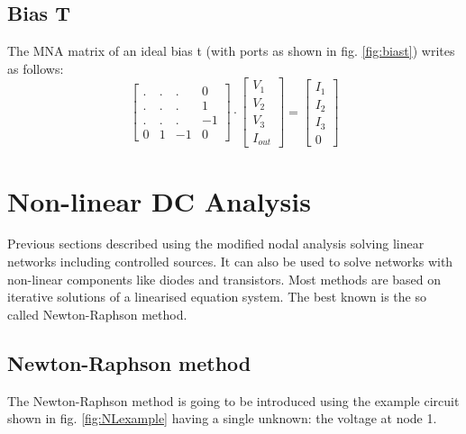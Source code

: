 \documentclass[10pt]{report}
\begin{document}
\subsection{Bias T}

The MNA matrix of an ideal bias t (with ports as shown in
fig. \ref{fig:biast}) writes as follows:
\begin{equation}
\begin{bmatrix}
 . & . & .  &  0\\
 . & . & .  &  1\\
 . & . & .  & -1\\
 0 & 1 & -1 &  0
\end{bmatrix}
\cdot
\begin{bmatrix}
V_{1}\\
V_{2}\\
V_{3}\\
I_{out}
\end{bmatrix}
=
\begin{bmatrix}
I_{1}\\
I_{2}\\
I_{3}\\
0
\end{bmatrix}
\end{equation}

\section{Non-linear DC Analysis}

Previous sections described using the modified nodal analysis solving
linear networks including controlled sources.  It can also be used to
solve networks with non-linear components like diodes and transistors.
Most methods are based on iterative solutions of a linearised equation
system.  The best known is the so called Newton-Raphson method.

\subsection{Newton-Raphson method}
\label{sec:NRmethod}

The Newton-Raphson method is going to be introduced using the example
circuit shown in fig. \ref{fig:NLexample} having a single unknown: the
voltage at node 1.
\end{document}

